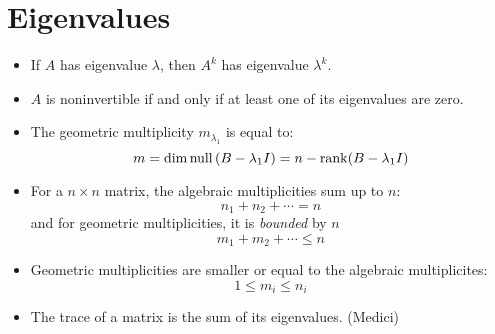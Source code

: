 \documentclass{article}
\begin{document}
    \section{Eigenvalues}
    \begin{itemize}
        \item If $A$ has eigenvalue $\lambda$, then $A^k$ has eigenvalue $\lambda^k$.
        \item $A$ is noninvertible if and only if at least one of its eigenvalues are zero. 
        \item The geometric multiplicity $m_{\lambda_1}$ is equal to:
        \begin{equation}
            m = \dim\mathrm{null}\,(B-\lambda_1I) = n- \rank(B-\lambda_1 I)
        \end{equation}
        \item For a $n\times n$ matrix, the algebraic multiplicities sum up to $n$:
        \begin{equation}
            n_1+n_2+\cdots = n
        \end{equation}
        and for geometric multiplicities, it is \textit{bounded} by $n$
        \begin{equation}
            m_1+m_2+\cdots \le n
        \end{equation}
        \item Geometric multiplicities are smaller or equal to the algebraic multiplicites:
        \begin{equation}
            1 \le m_i \le n_i
        \end{equation}
        \item The trace of a matrix is the sum of its eigenvalues. (Medici)
    \end{itemize}
\end{document}
